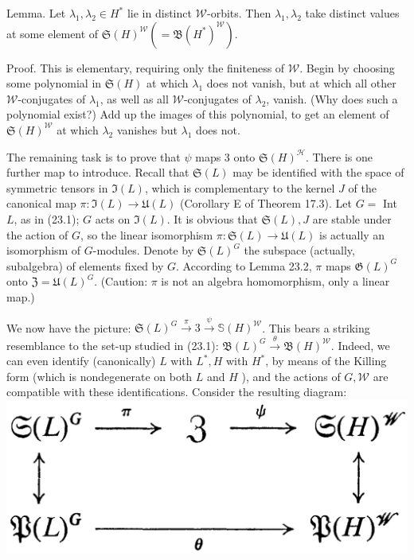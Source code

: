 \documentclass[10pt]{article}
\begin{document}
Lemma. Let $\lambda_{1}, \lambda_{2} \in H^{*}$ lie in distinct $\mathscr{W}$-orbits. Then $\lambda_{1}, \lambda_{2}$ take distinct values at some element of $\mathfrak{S}(H)^{\mathscr{W}}\left(=\mathfrak{B}\left(H^{*}\right)^{\mathscr{W}}\right)$.

Proof. This is elementary, requiring only the finiteness of $\mathscr{W}$. Begin by choosing some polynomial in $\mathfrak{S}(H)$ at which $\lambda_{1}$ does not vanish, but at which all other $\mathscr{W}$-conjugates of $\lambda_{1}$, as well as all $\mathscr{W}$-conjugates of $\lambda_{2}$, vanish. (Why does such a polynomial exist?) Add up the images of this polynomial, to get an element of $\mathfrak{S}(H)^{\mathscr{W}}$ at which $\lambda_{2}$ vanishes but $\lambda_{1}$ does not.

The remaining task is to prove that $\psi$ maps 3 onto $\mathfrak{S}(H)^{\mathscr{H}}$. There is one further map to introduce. Recall that $\mathfrak{S}(L)$ may be identified with the space of symmetric tensors in $\mathfrak{I}(L)$, which is complementary to the kernel $J$ of the canonical map $\pi: \mathfrak{I}(L) \rightarrow \mathfrak{U}(L)$ (Corollary E of Theorem 17.3). Let $G=$ Int $L$, as in (23.1); $G$ acts on $\mathfrak{I}(L)$. It is obvious that $\mathfrak{S}(L), J$ are stable under the action of $G$, so the linear isomorphism $\pi: \mathfrak{S}(L) \rightarrow \mathfrak{U}(L)$ is actually an isomorphism of $G$-modules. Denote by $\mathfrak{S}(L)^{G}$ the subspace (actually, subalgebra) of elements fixed by $G$. According to Lemma 23.2, $\pi$ maps $\mathfrak{G}(L)^{G}$ onto $\mathfrak{Z}=\mathfrak{U}(L)^{G}$. (Caution: $\pi$ is not an algebra homomorphism, only a linear map.)

We now have the picture: $\mathfrak{S}(L)^{G} \xrightarrow{\pi} 3 \xrightarrow{\psi} \mathbb{S}(H)^{\mathscr{W}}$. This bears a striking resemblance to the set-up studied in (23.1): $\mathfrak{B}(L)^{G} \xrightarrow{\theta} \mathfrak{B}(H)^{\mathscr{W}}$. Indeed, we can even identify (canonically) $L$ with $L^{*}, H$ with $H^{*}$, by means of the Killing form (which is nondegenerate on both $L$ and $H$ ), and the actions of $G, \mathscr{W}$ are compatible with these identifications. Consider the resulting diagram:\\
\includegraphics[max width=\textwidth, center]{2025_06_06_fac2836a92464059da43g-144}
\end{document}
